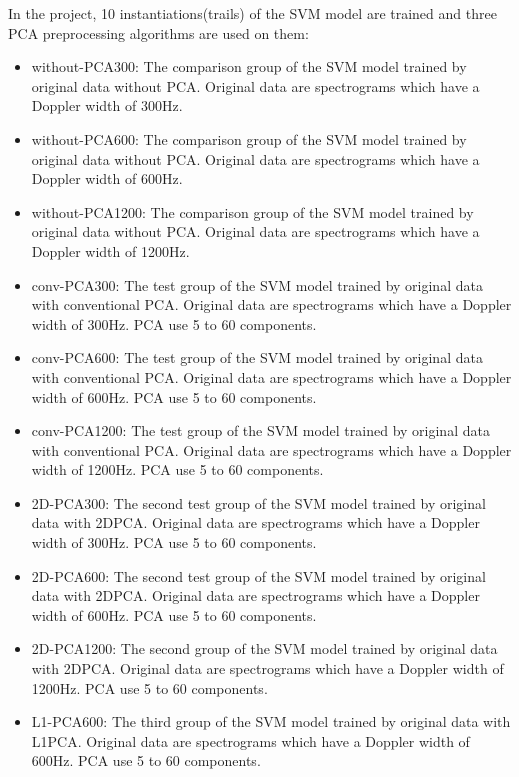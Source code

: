 \documentclass{cta-author}
\begin{document}
In the project, 10 instantiations(trails) of the SVM model are trained and three PCA preprocessing algorithms are used on them:
\begin{itemize}
    \item without-PCA300: The comparison group of the SVM model trained by original data without PCA. Original data are spectrograms which have a Doppler width of 300Hz.
    \item without-PCA600: The comparison group of the SVM model trained by original data without PCA. Original data are spectrograms which have a Doppler width of 600Hz.
    \item without-PCA1200: The comparison group of the SVM model trained by original data without PCA. Original data are spectrograms which have a Doppler width of 1200Hz.
    \item conv-PCA300: The test group of the SVM model trained by original data with conventional PCA. Original data are spectrograms which have a Doppler width of 300Hz. PCA use 5 to 60 components. 
    \item conv-PCA600: The test group of the SVM model trained by original data with conventional PCA. Original data are spectrograms which have a Doppler width of 600Hz. PCA use 5 to 60 components.
    \item conv-PCA1200: The test group of the SVM model trained by original data with conventional PCA. Original data are spectrograms which have a Doppler width of 1200Hz. PCA use 5 to 60 components.
    \item 2D-PCA300: The second test group of the SVM model trained by original data with 2DPCA. Original data are spectrograms which have a Doppler width of 300Hz. PCA use 5 to 60 components.
    \item 2D-PCA600: The second test group of the SVM model trained by original data with 2DPCA. Original data are spectrograms which have a Doppler width of 600Hz. PCA use 5 to 60 components.
    \item 2D-PCA1200: The second group of the SVM model trained by original data with 2DPCA. Original data are spectrograms which have a Doppler width of 1200Hz. PCA use 5 to 60 components.
    \item L1-PCA600: The third group of the SVM model trained by original data with L1PCA. Original data are spectrograms which have a Doppler width of 600Hz. PCA use 5 to 60 components.
\end{itemize}
\end{document}
